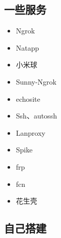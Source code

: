 
\begin{issues}
\issueDraft
\end{issues}

\subsection{一些服务}
\begin{itemize}
\item Ngrok
\item Natapp
\item 小米球
\item Sunny-Ngrok
\item echosite
\item Ssh、autossh
\item Lanproxy
\item Spike
\item frp
\item fcn
\item 花生壳
\end{itemize}

\subsection{自己搭建}